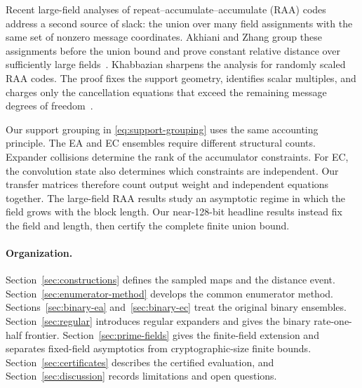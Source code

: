 Recent large-field analyses of repeat--accumulate--accumulate (RAA) codes
address a second source of slack: the union over many field assignments with
the same set of nonzero message coordinates.  Akhiani and Zhang group these
assignments before the union bound and prove constant relative distance over
sufficiently large fields~\cite{AkhianiZhang2026}.  Khabbazian sharpens the
analysis for randomly scaled RAA codes.  The proof fixes the support geometry,
identifies scalar multiples, and charges only the cancellation equations that
exceed the remaining message degrees of freedom~\cite{Khabbazian2026}.

Our support grouping in \eqref{eq:support-grouping} uses the same accounting
principle.  The EA and EC ensembles require different structural counts.
Expander collisions determine the rank of the accumulator constraints.  For
EC, the convolution state also determines which constraints are independent.
Our transfer matrices therefore count output weight and independent equations
together.  The large-field RAA results study an asymptotic regime in which the
field grows with the block length.  Our near-128-bit headline results instead
fix the field and length, then certify the complete finite union bound.

\paragraph{Organization.}
Section~\ref{sec:constructions} defines the sampled maps and the distance
event.  Section~\ref{sec:enumerator-method} develops the common enumerator
method.  Sections~\ref{sec:binary-ea} and~\ref{sec:binary-ec} treat the
original binary ensembles.  Section~\ref{sec:regular} introduces regular
expanders and gives the binary rate-one-half frontier.
Section~\ref{sec:prime-fields} gives the finite-field extension and separates
fixed-field asymptotics from cryptographic-size finite bounds.
Section~\ref{sec:certificates} describes the certified evaluation, and
Section~\ref{sec:discussion} records limitations and open questions.
